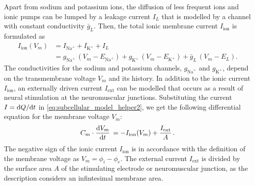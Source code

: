 Apart from sodium and potassium ions, the diffusion of less frequent ions and ionic pumps can be lumped by a leakage current $I_L$ that is modelled by a channel with constant conductivity $\bar{g}_L$.
Then, the total ionic membrane current $I_\text{ion}$ is formulated as
%
\begin{subequations}
\begin{align}\label{eq:subcellular_model_helper4}
  I_\text{ion}(V_m)  &= I_{\text{Na}^{+}} + I_{\text{K}^{+}} + I_L \\
  & = g_{\text{Na}^{+}}\,(V_m - E_{\text{Na}^{+}}) + g_{\text{K}^{+}}\,(V_m - E_{\text{K}^{+}}) + \bar{g}_L\,(V_m - E_L). \label{eq:subcellular_model_helper5}
\end{align}
\end{subequations}
%
The conductivities for the sodium and potassium channels, $g_{\text{Na}^{+}}$ and $g_{\text{K}^{+}}$, depend on the transmembrane voltage $V_m$ and its history.
In addition to the ionic current $I_\text{ion}$, an externally driven current $I_\text{ext}$ can be modelled that occurs as a result of neural stimulation at the neuromuscular junctions. Substituting the current $I=\d Q / \d t$ in \cref{eq:subcellular_model_helper2}, we get the following differential equation for the membrane voltage $V_m$:
\begin{align}\label{eq:subcellular_model_helper3}
  C_m \cdot \d{V_m}{t} = -I_\text{ion}(V_m) + \dfrac{I_\text{ext}}{A}.
\end{align}
%
The negative sign of the ionic current $I_\text{ion}$ is in accordance with the definition of the membrane voltage as $V_m=\phi_i-\phi_e$. The external current $I_\text{ext}$ is divided by the surface area $A$ of the stimulating electrode or neuromuscular junction, as the description considers an infintesimal membrane area.


